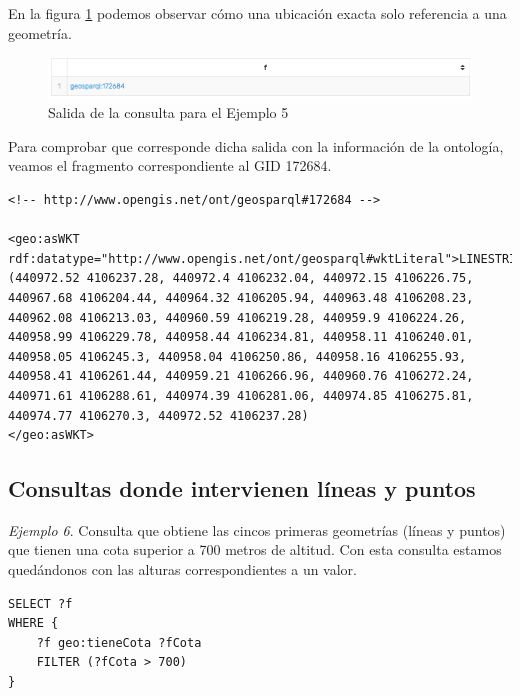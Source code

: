 En la figura \ref{fig:salida1} podemos observar cómo una ubicación exacta solo referencia a una geometría.

\begin{figure}[H]
	\centering
	\includegraphics[width=1\linewidth]{imagenes/capitulo5/salida1}
	\caption{Salida de la consulta para el Ejemplo 5}
	\label{fig:salida1}
\end{figure}

Para comprobar que corresponde dicha salida con la información de la ontología, veamos el fragmento correspondiente al GID 172684.

\vspace*{0.2cm}

\begin{lstlisting}
<!-- http://www.opengis.net/ont/geosparql#172684 -->

<geo:asWKT rdf:datatype="http://www.opengis.net/ont/geosparql#wktLiteral">LINESTRING (440972.52 4106237.28, 440972.4 4106232.04, 440972.15 4106226.75, 440967.68 4106204.44, 440964.32 4106205.94, 440963.48 4106208.23, 440962.08 4106213.03, 440960.59 4106219.28, 440959.9 4106224.26, 440958.99 4106229.78, 440958.44 4106234.81, 440958.11 4106240.01, 440958.05 4106245.3, 440958.04 4106250.86, 440958.16 4106255.93, 440958.41 4106261.44, 440959.21 4106266.96, 440960.76 4106272.24, 440971.61 4106288.61, 440974.39 4106281.06, 440974.85 4106275.81, 440974.77 4106270.3, 440972.52 4106237.28)
</geo:asWKT>
\end{lstlisting}

\subsection{Consultas donde intervienen líneas y puntos}

\textit{Ejemplo 6}. Consulta que obtiene las cincos primeras geometrías (líneas y puntos) que tienen una cota superior a 700 metros de altitud. Con esta consulta estamos quedándonos con las alturas correspondientes a un valor.

\vspace*{0.2cm}

\begin{lstlisting}
SELECT ?f
WHERE {
	?f geo:tieneCota ?fCota
	FILTER (?fCota > 700)
}
\end{lstlisting}

